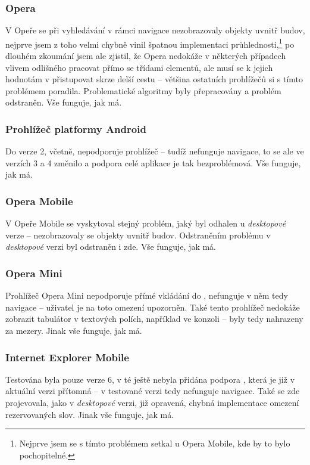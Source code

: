 \subsubsection*{Opera}
V Opeře se při vyhledávání v rámci navigace nezobrazovaly objekty uvnitř budov, nejprve jsem z toho velmi chybně vinil špatnou implementaci průhlednosti,\footnote{Nejprve jsem se s tímto problémem setkal u Opera Mobile, kde by to bylo pochopitelné.} po dlouhém zkoumání jsem ale zjistil, že Opera nedokáže v některých případech vlivem odlišného   pracovat přímo se třídami  elementů, ale musí se k jejich hodnotám v  přistupovat skrze delší cestu -- většina ostatních prohlížečů si s tímto problémem poradila. Problematické algoritmy byly přepracovány a problém odstraněn. Vše funguje, jak má.

\subsubsection*{Prohlížeč platformy Android}
Do verze 2, včetně, nepodporuje prohlížeč  -- tudíž nefunguje navigace, to se ale ve verzích 3 a 4 změnilo a podpora celé aplikace je tak bezproblémová. Vše funguje, jak má.

\subsubsection*{Opera Mobile}
V Opeře Mobile se vyskytoval stejný problém, jaký byl odhalen u \textit{desktopové} verze -- nezobrazovaly se objekty uvnitř budov. Odstraněním problému v \textit{desktopové} verzi byl odstraněn i zde. Vše funguje, jak má.

\subsubsection*{Opera Mini}
Prohlížeč Opera Mini nepodporuje přímé vkládání  do , nefunguje v něm tedy navigace -- uživatel je na toto omezení upozorněn. Také tento prohlížeč nedokáže zobrazit tabulátor v textových polích, například ve  konzoli -- byly tedy nahrazeny za mezery. Jinak vše funguje, jak má.

\subsubsection*{Internet Explorer Mobile}
Testována byla pouze verze 6, v té ještě nebyla přidána podpora , která je již v aktuální verzi přítomná -- v testované verzi tedy nefunguje navigace. Také se zde projevovala, jako v \textit{desktopové} verzi, již opravená, chybná implementace omezení rezervovaných slov. Jinak vše funguje, jak má.

